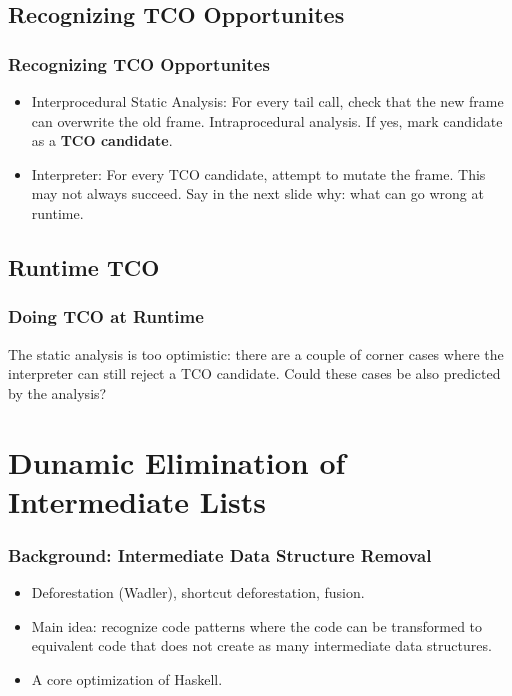 \documentclass{beamer}
\begin{document}
\subsection{Recognizing TCO Opportunites}

\begin{frame}
\frametitle{Recognizing TCO Opportunites}

\begin{itemize}
\item Interprocedural Static Analysis: For every tail call, check that
  the new frame can overwrite the old frame. Intraprocedural
  analysis. If yes, mark candidate as a \textbf{TCO candidate}.
\item Interpreter: For every TCO candidate, attempt to mutate the
  frame. This may not always succeed. Say in the next slide why: what
  can go wrong at runtime.
\end{itemize}

\end{frame}

\subsection{Runtime TCO}

\begin{frame}
  \frametitle{Doing TCO at Runtime}

The static analysis is too optimistic: there are a couple of corner
cases where the interpreter can still reject a TCO candidate. Could
these cases be also predicted by the analysis?

\end{frame}


\section{Dunamic Elimination of Intermediate Lists}

\begin{frame}
  \frametitle{Background: Intermediate Data Structure Removal}

  \begin{itemize}
  \item Deforestation (Wadler), shortcut deforestation, fusion.
  \item Main idea: recognize code patterns where the code can be
    transformed to equivalent code that does not create as many
    intermediate data structures.
  \item A core optimization of Haskell.
  \end{itemize}
\end{frame}
\end{document}
